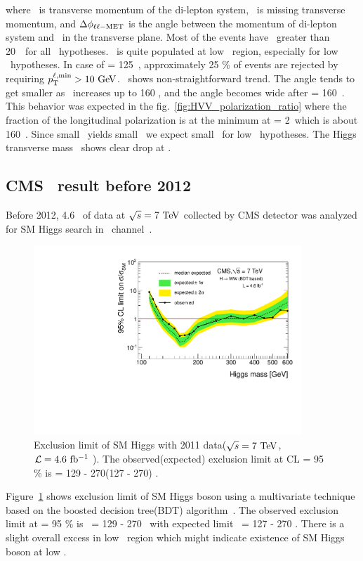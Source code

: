 where \ptll\ is transverse momentum of the di-lepton system, 
\met\ is missing transverse momentum, and  
$\Delta\phi_{\ell\ell-\mathrm{MET}}$ is the angle between the momentum of di-lepton
system and \met\ in the transverse plane.
Most of the events have \ptlmax\ greater than 20~\GeV\ for all \mHi\ hypotheses. 
\ptlmin\ is quite populated at low \ptlmin\ region, especially for low \mHi\ 
hypotheses. In case of \mHi = 125~\GeV, approximately 25 \% of 
events are rejected by requiring $p_{\mathrm{T}}^{\ell,\mathrm{min}}>10~\mathrm{Ge\kern -0.1em V}$. 
\delphill\ shows non-straightforward trend. The angle tends to get smaller 
as \mHi\ increases up to 160 \GeV, and the angle becomes wide 
after \mHi = 160~\GeV. This behavior was expected in the 
fig.~\ref{fig:HVV_polarization_ratio} where the fraction of the 
longitudinal polarization is at the minimum at \mHi = 2\mW\ which is about 160~\GeV. 
Since small \delphill\ yields small \mll\, we expect small \mll\ 
for low \mHi\ hypotheses. The Higgs transverse mass \mT\ shows clear 
drop at \mHi. 

%
\subsection{CMS \hww\ result before 2012}

Before 2012, 4.6 \ifb\ of data at $\sqrt{s}=7~\mathrm{Te\kern -0.1em V}$ collected by CMS detector 
was analyzed for SM Higgs search in \hww\ channel~\cite{Chatrchyan201291}. 
\begin{figure}
\centering
\includegraphics[width=0.9\textwidth]{figures/limits_nj_shape.pdf}
\caption{ Exclusion limit of SM Higgs with 2011 data($\sqrt{s}=7~\mathrm{Te\kern -0.1em V}$, $\mathcal{L}=4.6~\mathrm{fb^{-1}}$ ).
The observed(expected) exclusion limit at CL  = 95 \% is \mHi = 129 - 270(127 - 270) \GeV.}
\label{fig:hww2011}
\end{figure}
Figure~\ref{fig:hww2011} shows exclusion limit of SM Higgs boson 
using a multivariate technique based on the boosted decision tree(BDT) algorithm~\cite{}.
The observed exclusion limit at \CLs  = 95 \% is \mHi\ = 129 - 270 \GeV\
with expected limit \mHi\ = 127 - 270 \GeV. There is a slight overall excess 
in low \mHi\ region which might indicate existence of SM Higgs boson at low \mHi.  

